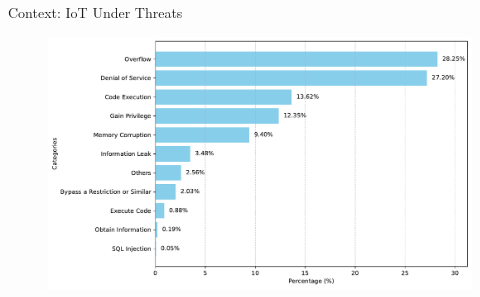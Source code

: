 \begin{frame}{Context: IoT Under Threats}
    \begin{center}
        \begin{minipage}[r]{.4\textwidth}
            \begin{figure}
                \centering
                \includegraphics[width=\textwidth]{src/1_introduction/img/threats_iot_graph.pdf}
            \end{figure}
        \end{minipage}\hspace{.5cm}%
        \begin{minipage}[c]{0.3\textwidth}
        \end{minipage}
    \end{center}
\end{frame}

